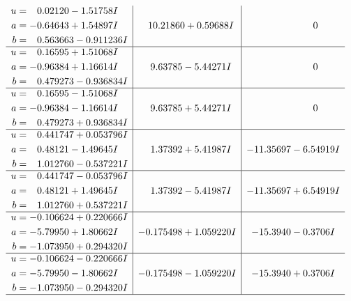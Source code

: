 \documentclass[1p]{elsarticle_modified}
\theoremstyle{definition}
\begin{document}
$$\begin{array}{c|c|c}
\begin{aligned}
u &= \phantom{-}0.02120 - 1.51758 I \\
a &= -0.64643 + 1.54897 I \\
b &= \phantom{-}0.563663 - 0.911236 I\end{aligned}
 & \phantom{-}10.21860 + 0.59688 I & \phantom{-0.000000 } 0 \\ \hline\begin{aligned}
u &= \phantom{-}0.16595 + 1.51068 I \\
a &= -0.96384 + 1.16614 I \\
b &= \phantom{-}0.479273 - 0.936834 I\end{aligned}
 & \phantom{-}9.63785 - 5.44271 I & \phantom{-0.000000 } 0 \\ \hline\begin{aligned}
u &= \phantom{-}0.16595 - 1.51068 I \\
a &= -0.96384 - 1.16614 I \\
b &= \phantom{-}0.479273 + 0.936834 I\end{aligned}
 & \phantom{-}9.63785 + 5.44271 I & \phantom{-0.000000 } 0 \\ \hline\begin{aligned}
u &= \phantom{-}0.441747 + 0.053796 I \\
a &= \phantom{-}0.48121 - 1.49645 I \\
b &= \phantom{-}1.012760 - 0.537221 I\end{aligned}
 & \phantom{-}1.37392 + 5.41987 I & -11.35697 - 6.54919 I \\ \hline\begin{aligned}
u &= \phantom{-}0.441747 - 0.053796 I \\
a &= \phantom{-}0.48121 + 1.49645 I \\
b &= \phantom{-}1.012760 + 0.537221 I\end{aligned}
 & \phantom{-}1.37392 - 5.41987 I & -11.35697 + 6.54919 I \\ \hline\begin{aligned}
u &= -0.106624 + 0.220666 I \\
a &= -5.79950 + 1.80662 I \\
b &= -1.073950 + 0.294320 I\end{aligned}
 & -0.175498 + 1.059220 I & -15.3940 - 0.3706 I \\ \hline\begin{aligned}
u &= -0.106624 - 0.220666 I \\
a &= -5.79950 - 1.80662 I \\
b &= -1.073950 - 0.294320 I\end{aligned}
 & -0.175498 - 1.059220 I & -15.3940 + 0.3706 I\\
 \hline 
 \end{array}$$\newpage\newpage\renewcommand{\arraystretch}{1}
\end{document}
